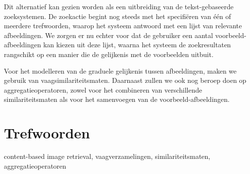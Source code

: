 Dit alternatief kan gezien worden als een uitbreiding van de tekst-gebaseerde zoeksystemen.
De zoekactie begint nog steeds met het specifi\"eren van \'e\'en of meerdere trefwoorden, waarop
het systeem antwoord met een lijst van relevante afbeeldingen. We zorgen er nu echter voor
dat de gebruiker een aantal voorbeeld-afbeeldingen kan kiezen uit deze lijst, waarna het
systeem de zoekresultaten rangschikt op een manier die de gelijkenis met de voorbeelden uitbuit.

Voor het modelleren van de graduele gelijkenis tussen afbeeldingen, maken we gebruik van 
vaagsimilariteitsmaten. Daarnaast zullen we ook nog beroep doen op aggregatieoperatoren,
zowel voor het combineren van verschillende similariteitsmaten als voor het samenvoegen
van de voorbeeld-afbeeldingen. 

\section*{Trefwoorden}
content-based image retrieval, vaagverzamelingen, similariteitsmaten, aggregatieoperatoren


